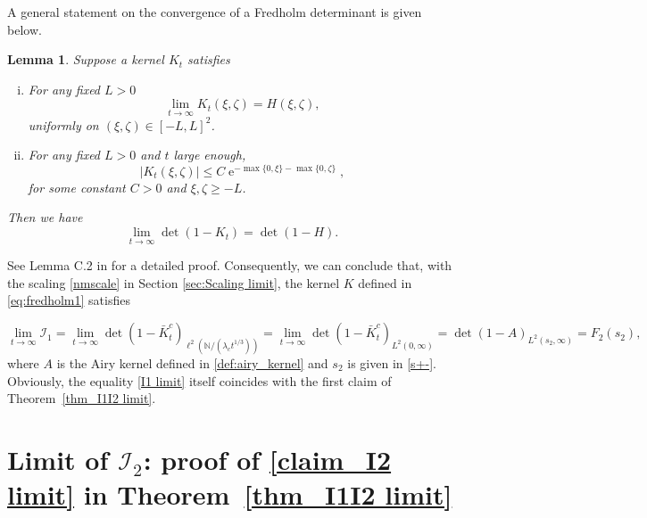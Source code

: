 \documentclass[cmp]{svjour}
\numberwithin{theorem}{section}
\numberwithin{equation}{section}
\DeclareMathOperator{\e}{e}
\newtheorem{lemman}[theorem]{Lemma}
\begin{document}
A general statement on the convergence of a Fredholm determinant is given below.
\begin{lemman}
\label{lem:kernel lim}
Suppose a kernel $K_t$ satisfies
\begin{enumerate}[(i)]
\item
  For any fixed $L>0$
  \begin{equation*}
    \lim_{t\rightarrow \infty}K_t( \xi, \zeta)=H(\xi,\zeta),
  \end{equation*}
  uniformly on $(\xi,\zeta)\in[-L,L]^2$.
\item For any fixed $L>0$ and $t$ large enough,
\begin{equation*}
  |K_t( \xi, \zeta)| \leq C \e^{
  -\max\{0,\xi\}-\max\{0,\zeta\}},
\end{equation*}
for some constant $C>0$ and $\xi,\zeta\geq -L$.
\end{enumerate}
Then we have
\begin{equation*}
\lim_{t \rightarrow \infty} \det(1-K_t)=\det(1-H).
\end{equation*}
\end{lemman}
See Lemma C.2 in \cite{IS2019} for a detailed proof. Consequently, we can conclude that, with the scaling \eqref{nmscale} in Section \ref{sec:Scaling limit}, the kernel $K$ defined in \eqref{eq:fredholm1} satisfies 

\begin{equation}
\label{I1 limit}
\lim_{t\rightarrow\infty}\mathcal{I}_1
= \lim_{t\rightarrow\infty}\det(1-\bar{K}^c_t)_{\ell^2(\mathbb{N}/(\lambda_c t^{1/3}))} = \lim_{t\rightarrow\infty}\det(1-\bar{K}^c_t)_{L^2(0,\infty)} = \det(1-A)_{L^2(s_2 , \infty)}  
=F_2(s_2),
\end{equation}
where $A$ is the Airy kernel defined in \eqref{def:airy_kernel} and $s_2$ is given in \eqref{s+-}.
Obviously, the equality \eqref{I1 limit} itself coincides with the first claim of Theorem~\ref{thm_I1I2 limit}.



\section{Limit of $\mathcal{I}_2$: proof of \eqref{claim_I2 limit} in Theorem~\ref{thm_I1I2 limit} }
\label{sec:Asymptotics_second}
\end{document}
